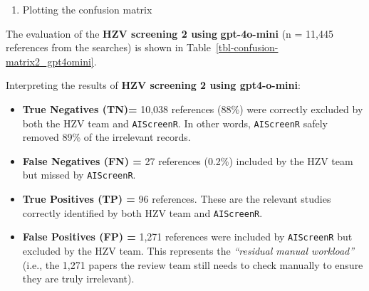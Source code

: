 \documentclass[
  letterpaper,
  DIV=11,
  numbers=noendperiod]{scrartcl}
\providecommand{\tightlist}{%
  \setlength{\itemsep}{0pt}\setlength{\parskip}{0pt}}
\begin{document}
\begin{enumerate}
\def\labelenumi{\arabic{enumi}.}
\setcounter{enumi}{2}
\tightlist
\item
  Plotting the confusion matrix
\end{enumerate}

The evaluation of the \textbf{HZV screening 2 using}
\textbf{gpt-4o-mini} (n = 11,445 references from the searches) is shown
in Table~\ref{tbl-confusion-matrix2_gpt4omini}.

\begin{table}

\caption{\label{tbl-confusion-matrix2_gpt4omini}Confusion matrix
AIScreenR vs HZV team - tuned prompt using gpt-4o-mini}


\end{table}%

Interpreting the results of \textbf{HZV screening 2 using gpt4-o-mini}:

\begin{itemize}
\item
  \textbf{True Negatives (TN)=} 10,038 references (88\%) were correctly
  excluded by both the HZV team and \texttt{AIScreenR}. In other words,
  \texttt{AIScreenR} safely removed 89\% of the irrelevant records.
\item
  \textbf{False Negatives (FN) =} 27 references (0.2\%) included by the
  HZV team but missed by \texttt{AIScreenR}.
\item
  \textbf{True Positives (TP) =} 96 references. These are the relevant
  studies correctly identified by both HZV team and \texttt{AIScreenR}.
\item
  \textbf{False Positives (FP) =} 1,271 references were included by
  \texttt{AIScreenR} but excluded by the HZV team. This represents the
  \emph{``residual manual workload''} (i.e., the 1,271 papers the review
  team still needs to check manually to ensure they are truly
  irrelevant).
\end{itemize}
\end{document}
